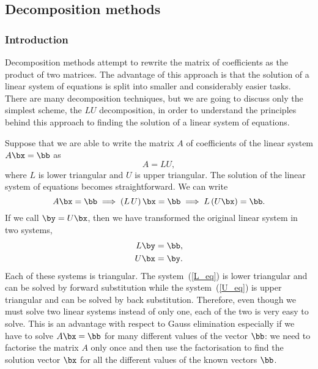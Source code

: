\subsection{Decomposition methods}

\subsubsection{Introduction}

Decomposition methods attempt to rewrite the matrix of coefficients as
the product of two matrices.  The advantage of this approach is that
the solution of a linear system of equations is split into smaller and
considerably easier tasks.  There are many decomposition techniques,
but we are going to discuss only the simplest scheme, the $LU$
decomposition, in order to understand the principles behind this
approach to finding the solution of a linear system of equations.

Suppose that we are able to write the matrix $A$ of coefficients of
the linear system $A \bx = \bb$ as
%
\begin{equation*}
  A = L U ,
\end{equation*}
%
where  $L$ is lower  triangular   and $U$  is  upper triangular.   The
solution  of the linear   system of equations becomes straightforward.
We can write
%
\begin{equation*}
  A \bx = \bb \implies ( L \, U ) \, \bx = \bb \implies
  L \left ( U \bx \right ) = \bb .
\end{equation*}
%
If we call $\by = U \bx $, then we have transformed the original
linear system in two systems,
%
\begin{align}
  L \by &= \bb , \label{L_eq} \\
  U \bx &= \by . \label{U_eq}
\end{align}
%
Each of these systems is triangular.  The system~(\ref{L_eq}) is lower
triangular and can be solved by forward substitution while the
system~(\ref{U_eq}) is upper triangular and can be solved by back
substitution.   Therefore, even though we must solve two linear
systems instead of only one, each of the two is very easy to solve.
This is an advantage with respect to Gauss elimination especially if
we have to solve $A \bx = \bb$ for many different values of the vector
$\bb$: we need to factorise the matrix $A$ only once and then use the
factorisation to find the solution vector $\bx$ for all the different
values of the known vectors $\bb$.

\medskip

